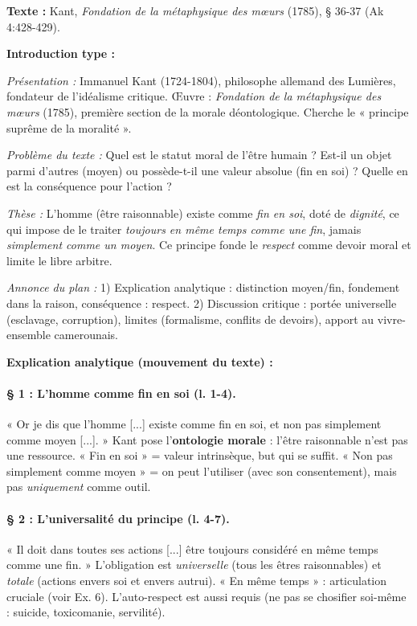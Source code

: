 \documentclass[11pt]{article}
\begin{document}
\begin{corrige}
\textbf{Texte :} Kant, \emph{Fondation de la métaphysique des mœurs} (1785), § 36-37 (Ak 4:428-429).

\textbf{Introduction type :}
\par \textit{Présentation :} Immanuel Kant (1724-1804), philosophe allemand des Lumières, fondateur de l'idéalisme critique. Œuvre : \emph{Fondation de la métaphysique des mœurs} (1785), première section de la morale déontologique. Cherche le « principe suprême de la moralité ».
\par \textit{Problème du texte :} Quel est le statut moral de l'être humain ? Est-il un objet parmi d'autres (moyen) ou possède-t-il une valeur absolue (fin en soi) ? Quelle en est la conséquence pour l'action ?
\par \textit{Thèse :} L'homme (être raisonnable) existe comme \emph{fin en soi}, doté de \emph{dignité}, ce qui impose de le traiter \emph{toujours en même temps comme une fin}, jamais \emph{simplement comme un moyen}. Ce principe fonde le \emph{respect} comme devoir moral et limite le libre arbitre.
\par \textit{Annonce du plan :} 1) Explication analytique : distinction moyen/fin, fondement dans la raison, conséquence : respect. 2) Discussion critique : portée universelle (esclavage, corruption), limites (formalisme, conflits de devoirs), apport au vivre-ensemble camerounais.

\textbf{Explication analytique (mouvement du texte) :}

\paragraph{§ 1 : L'homme comme fin en soi (l. 1-4).} « Or je dis que l'homme [...] existe comme fin en soi, et non pas simplement comme moyen [...]. » Kant pose l'\textbf{ontologie morale} : l'être raisonnable n'est pas une ressource. « Fin en soi » = valeur intrinsèque, but qui se suffit. « Non pas simplement comme moyen » = on peut l'utiliser (avec son consentement), mais pas \emph{uniquement} comme outil.

\paragraph{§ 2 : L'universalité du principe (l. 4-7).} « Il doit dans toutes ses actions [...] être toujours considéré en même temps comme une fin. » L'obligation est \emph{universelle} (tous les êtres raisonnables) et \emph{totale} (actions envers soi et envers autrui). « En même temps » : articulation cruciale (voir Ex. 6). L'auto-respect est aussi requis (ne pas se chosifier soi-même : suicide, toxicomanie, servilité).


\end{corrige}
\end{document}
